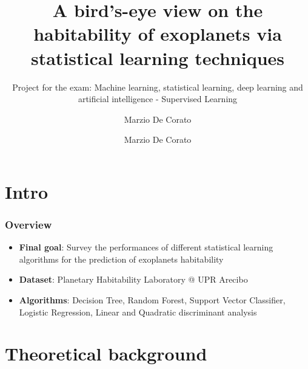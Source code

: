 \documentclass[compress]{beamer}
\author{Marzio De Corato}
\title[Exoplanets survey via SL techniques]{A bird’s-eye view on the habitability of exoplanets via statistical learning techniques}
\author{}
\date{}
\subtitle{Project for the exam: Machine learning, statistical
learning, deep learning and artificial intelligence - Supervised Learning}
\begin{document}
\frame{\vspace{+4.5cm}\titlepage}

\usebackgroundtemplate{ } 

\author{Marzio De Corato}

\section{Intro}

\begin{frame}
\frametitle{Overview}
\begin{itemize}
\item\textbf{Final goal}: Survey the performances of different statistical learning algorithms for the prediction of exoplanets habitability
\item\textbf{Dataset}: Planetary Habitability Laboratory @ UPR Arecibo \cite{planet_dataset}
\item\textbf{Algorithms}: Decision Tree, Random Forest, Support Vector Classifier, Logistic Regression, Linear and Quadratic discriminant analysis
\end{itemize}
\end{frame}

\section{Theoretical background}
\end{document}

